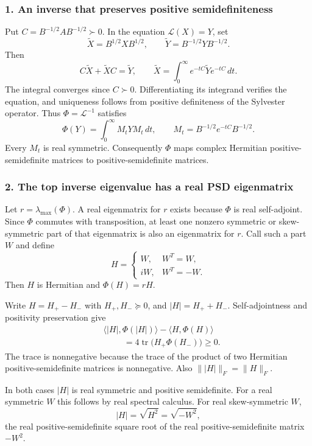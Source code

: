 \documentclass[10pt,a4paper]{article}
\begin{document}
\subsubsection{1. An inverse that preserves positive
semidefiniteness}\label{an-inverse-that-preserves-positive-semidefiniteness}

Put \(C=B^{-1/2}AB^{-1/2}\succ0\). In the equation \(\mathcal L(X)=Y\),
set \[
\widetilde X=B^{1/2}XB^{1/2},\qquad
\widetilde Y=B^{-1/2}YB^{-1/2}.
\] Then \[
C\widetilde X+\widetilde XC=\widetilde Y,
\qquad
\widetilde X=\int_0^\infty e^{-tC}\widetilde Y e^{-tC}\,dt.
\] The integral converges since \(C\succ0\). Differentiating its
integrand verifies the equation, and uniqueness follows from positive
definiteness of the Sylvester operator. Thus \(\Phi=\mathcal L^{-1}\)
satisfies \[
\Phi(Y)=\int_0^\infty M_tYM_t\,dt,
\qquad M_t=B^{-1/2}e^{-tC}B^{-1/2}.
\] Every \(M_t\) is real symmetric. Consequently \(\Phi\) maps complex
Hermitian positive-semidefinite matrices to positive-semidefinite
matrices.

\subsubsection{2. The top inverse eigenvalue has a real PSD
eigenmatrix}\label{the-top-inverse-eigenvalue-has-a-real-psd-eigenmatrix}

Let \(r=\lambda_{\max}(\Phi)\). A real eigenmatrix for \(r\) exists
because \(\Phi\) is real self-adjoint. Since \(\Phi\) commutes with
transposition, at least one nonzero symmetric or skew-symmetric part of
that eigenmatrix is also an eigenmatrix for \(r\). Call such a part
\(W\) and define \[
H=\begin{cases}
W,&W^T=W,\\
iW,&W^T=-W.
\end{cases}
\] Then \(H\) is Hermitian and \(\Phi(H)=rH\).

Write \(H=H_+-H_-\) with \(H_+,H_-\succeq0\), and \(|H|=H_++H_-\).
Self-adjointness and positivity preservation give \[
\begin{aligned}
&\langle |H|,\Phi(|H|)\rangle-\langle H,\Phi(H)\rangle\\
&\hspace{1cm}=4\operatorname{tr}\bigl(H_+\Phi(H_-)\bigr)\ge0.
\end{aligned}
\] The trace is nonnegative because the trace of the product of two
Hermitian positive-semidefinite matrices is nonnegative. Also
\(\||H|\|_F=\|H\|_F\).

In both cases \(|H|\) is real symmetric and positive semidefinite. For a
real symmetric \(W\) this follows by real spectral calculus. For real
skew-symmetric \(W\), \[
|H|=\sqrt{H^2}=\sqrt{-W^2},
\] the real positive-semidefinite square root of the real
positive-semidefinite matrix \(-W^2\).
\end{document}
